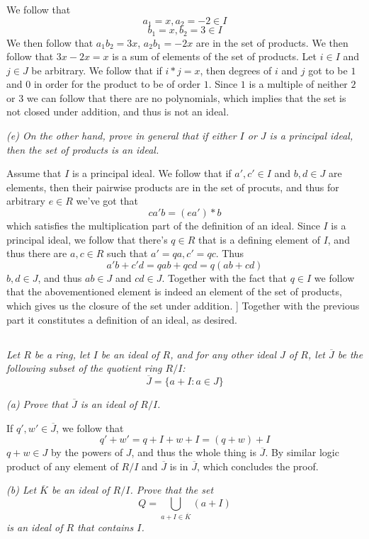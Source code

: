 \documentclass[11pt,oneside,titlepage]{book}
\newcommand{\set}[1]{\{ #1 \}}
\begin{document}
We follow that
$$a_1 = x, a_2 = -2 \in I$$
$$b_1 = x, b_2 = 3 \in I$$
We then follow that $a_1 b_2 = 3x$, $a_2 b_1 = -2x$ are in the set of
products. We then follow that $3x - 2x = x$ is a sum of elements of
the set of products. Let $i \in I$ and $j \in J$ be arbitrary.
We follow that if $i * j = x$, then degrees of $i$ and $j$ got
to be $1$ and $0$ in order for the product to be of order $1$.
Since $1$ is a multiple of neither $2$ or $3$ we can follow that
there are no polynomials, which implies that the set is not closed
under addition, and thus is not an ideal.

\textit{(e) On the other hand, prove in general that if either $I$ or
  $J$ is a principal ideal, then the set of products is an ideal.}

Assume that $I$ is a principal ideal. We follow that if $a', c' \in I$
and $b, d \in J$ are elements, then their pairwise products are in the
set of procuts, and thus for arbitrary $e \in R$ we've got that
$$c a'b = (ea') * b$$
which satisfies the multiplication part of the definition of an ideal.
Since $I$ is a principal ideal, we follow that there's $q \in R$ that
is a defining element of $I$, and thus there are $a, c \in R$ such
that $a' = qa, c' = qc$. Thus
$$a'b + c'd = qab + qcd = q(ab + cd)$$
$b, d \in J$, and thus $ab \in J$ and $cd \in J$. Together with the
fact that $q \in I$ we follow that the abovementioned element is
indeed an element of the set of products, which gives us the closure
of the set under addition. ] Together with the previous part it
constitutes a definition of an ideal, as desired.

\subsection{}

\textit{Let $R$ be a ring, let $I$ be an ideal of $R$, and for any other ideal $J$ of $R$,
  let $\overline{J}$ be the following subset of the quotient ring $R/I$:
  $$\overline{J} = \set{a + I: a \in J}$$}

\textit{(a) Prove that $\overline{J}$ is an ideal of $R/I$.}

If $q', w' \in \overline{J}$, we follow that
$$q' + w' = q + I + w + I = (q + w) + I$$
$q + w \in J$ by the powers of $J$, and thus the whole thing is
$\overline{J}$. By similar logic product of any element of $R/I$ and
$\overline{J}$ is in $\overline{J}$, which concludes the proof.

\textit{(b) Let $\overline{K}$ be an ideal of $R/I$. Prove that the
  set
  $$Q = \bigcup_{a + I \in \overline{K}}{(a + I)}$$
  is an ideal of $R$ that contains $I$.}
\end{document}
